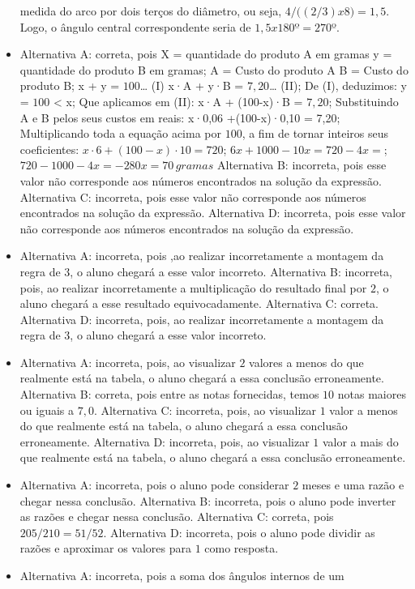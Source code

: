 \begin{itemize}
medida do arco por dois terços do diâmetro, ou seja, $4/((2/3) x $8$) =
1,5$. Logo, o ângulo central correspondente seria de $1,5 x 180º = 270$º.
\item Alternativa A: correta, pois X = quantidade do produto A em gramas y = quantidade do produto B em
gramas; A = Custo do produto A B = Custo do produto B; x + y = $100$\ldots{} (I) x·A + y·B = $7,20$\ldots{} (II); De (I), deduzimos: y = $100$ \textless{} x; Que aplicamos em (II): x·A + (100-x)·B = $7,20$; Substituindo A e B pelos seus custos em reais: x·0,06 +(100-x)·0,10 = 7,20; Multiplicando toda a equação acima por $100$, a fim de tornar inteiros seus coeficientes: $x·6 + (100-x)·10 = 720$; $6x + 1 000 - 10x = 720 -4x =$; $720 - 1000 -4x = -280 x = 70\,gramas$
Alternativa B: incorreta, pois esse valor não corresponde aos números
encontrados na solução da expressão.
Alternativa C: incorreta, pois esse valor não corresponde aos números
encontrados na solução da expressão.
Alternativa D: incorreta, pois esse valor não corresponde aos números
encontrados na solução da expressão.
\item Alternativa A: incorreta, pois ,ao realizar incorretamente a montagem da
regra de $3$, o aluno chegará a esse valor incorreto.
Alternativa B: incorreta, pois, ao realizar incorretamente a
multiplicação do resultado final por $2$, o aluno chegará a esse resultado
equivocadamente.
Alternativa C: correta.
Alternativa D: incorreta, pois, ao realizar incorretamente a montagem da
regra de $3$, o aluno chegará a esse valor incorreto.
\item Alternativa A: incorreta, pois, ao visualizar $2$ valores a menos do que
realmente está na tabela, o aluno chegará a essa conclusão erroneamente.
Alternativa B: correta, pois entre as notas fornecidas, temos $10$ notas
maiores ou iguais a $7,0$.
Alternativa C: incorreta, pois, ao visualizar $1$ valor a menos do que
realmente está na tabela, o aluno chegará a essa conclusão erroneamente.
Alternativa D: incorreta, pois, ao visualizar $1$ valor a mais do que
realmente está na tabela, o aluno chegará a essa conclusão erroneamente.
\item Alternativa A: incorreta, pois o aluno pode considerar $2$ meses e uma
razão e chegar nessa conclusão.
Alternativa B: incorreta, pois o aluno pode inverter as razões e chegar
nessa conclusão.
Alternativa C: correta, pois $205/210 = 51/52$.
Alternativa D: incorreta, pois o aluno pode dividir as razões e
aproximar os valores para $1$ como resposta.
\item Alternativa A: incorreta, pois a soma dos ângulos internos de um

\end{itemize}
